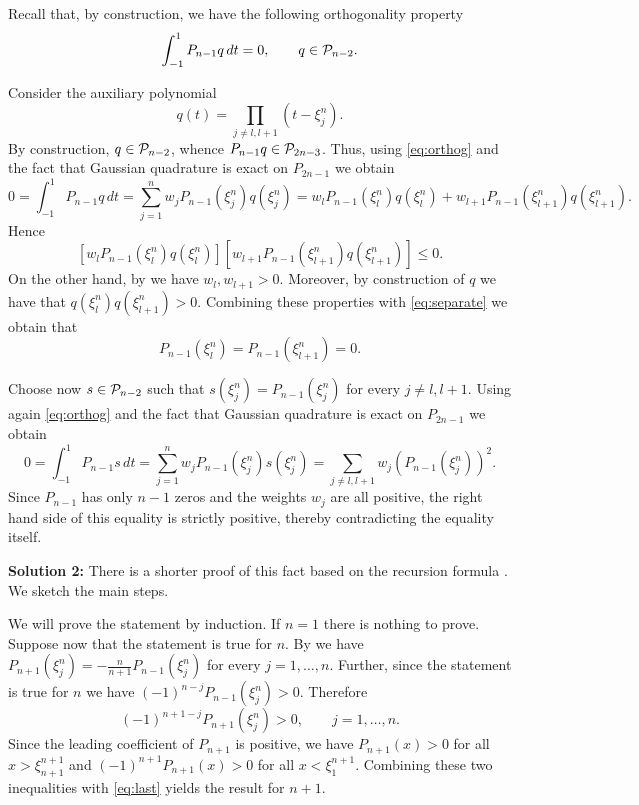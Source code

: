 \begin{problem}
\begin{subproblem}[5]
\begin{solution}
Recall that, by construction, we have the following orthogonality property
\begin{equation}\label{eq:orthog}
\int_{-1}^1P_{n-1}q\,dt=0,\qquad q\in{\cal P}_{n-2}.
\end{equation}

Consider the auxiliary polynomial
\[
q(t)=\prod_{j\neq l,l+1} (t-\xi^n_j).
\]
By construction, $q\in{\cal P}_{n-2}$, whence $P_{n-1}q\in{\cal P}_{2n-3}$. Thus, using \eqref{eq:orthog} and the fact that Gaussian quadrature is exact on $P_{2n-1}$ we obtain
\[
0 = \int_{-1}^1P_{n-1}q\,dt 
 = \sum_{j=1}^n w_j P_{n-1}(\xi_j^n) q(\xi^n_j) 
 = w_l P_{n-1}(\xi_l^n) q(\xi^n_l) + w_{l+1} P_{n-1}(\xi_{l+1}^n) q(\xi^n_{l+1}).
\]
Hence
\[
\left[ w_l P_{n-1}(\xi_l^n) q(\xi^n_l) \right] \left[ w_{l+1} P_{n-1}(\xi_{l+1}^n) q(\xi^n_{l+1})\right]\le 0.
\]
On the other hand, by  we have $w_l ,w_{l+1}>0$. Moreover, by construction of $q$ we have that $q(\xi^n_l)q(\xi^n_{l+1})>0$. Combining these properties with \eqref{eq:separate} we obtain that
\[
P_{n-1}(\xi_l^n)=P_{n-1}(\xi_{l+1}^n)=0.
\]

Choose now $s\in {\cal P}_{n-2}$ such that $s(\xi^n_j)=P_{n-1}(\xi_j^n)$ for every $j\neq l,l+1$. Using again \eqref{eq:orthog} and the fact that Gaussian quadrature is exact on $P_{2n-1}$ we obtain
\[
0=\int_{-1}^1 P_{n-1} s\,dt=\sum_{j=1}^n w_j P_{n-1}(\xi_j^n) s(\xi_j^n)= \sum_{j\neq l,l+1} w_j (P_{n-1}(\xi_j^n))^2.
\]
Since $P_{n-1}$ has only $n-1$ zeros and the weights $w_j$ are all positive, the right hand side of this equality is strictly positive, thereby contradicting the equality itself.

\textbf{Solution 2: }
There is a shorter proof of this fact based on the recursion formula . We sketch the main steps.

We will prove the statement by induction. If $n=1$ there is nothing to prove. Suppose now that the statement is true for $n$. By  we have $P_{n+1}(\xi^n_j)=-\frac{n}{n+1}P_{n-1}(\xi^n_j)$ for every $j=1,\dots,n$. Further, since the statement is true for $n$ we have $(-1)^{n-j}P_{n-1}(\xi^n_j)>0$. Therefore
\begin{equation}\label{eq:last}
(-1)^{n+1-j}P_{n+1}(\xi^n_j)>0,\qquad j=1,\dots,n.
\end{equation}
Since the leading coefficient of $P_{n+1}$ is positive, we have $P_{n+1}(x)>0$ for all $x>\xi^{n+1}_{n+1}$ and $(-1)^{n+1}P_{n+1}(x)>0$ for all $x<\xi^{n+1}_{1}$. Combining these two inequalities with \eqref{eq:last} yields the result for $n+1$.
\end{solution}
\end{subproblem}



\end{problem}
